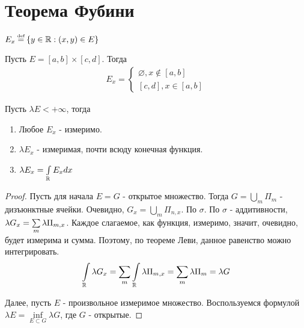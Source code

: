 \section{Теорема Фубини}

\begin{definition}
    $E_x \defeq \set{y \in \mathbb{R} : (x, y) \in E}$
\end{definition}

\begin{example}
    Пусть $E = [a, b] \times [c, d]$. Тогда 
    \begin{gather*}
        E_x = 
        \left\{ \begin{matrix}
                \varnothing, x \notin [a,b] 
                \\ 
                [c, d], x \in [a, b]
        \end{matrix}\right.
    \end{gather*}
\end{example}

\begin{theorem}
    Пусть $\lambda E < +\infty$, тогда
    \begin{enumerate}
        \item 
            Любое $E_x$ - измеримо.
        \item
            $\lambda E_x$ - измеримая, почти всюду конечная функция. 
        \item
            $\lambda E_x = \int\limits_{\mathbb{R}} E_x dx$
    \end{enumerate}
\end{theorem}

\begin{proof}
    Пусть для начала $E = G$ - открытое множество. Тогда $G = \bigcup\limits_{m} \Pi_m$ - дизъюнктные ячейки. 
    Очевидно, $G_x = \bigcup\limits_{m} \Pi_{n, x}$. По $\sigma$. По $\sigma$ - аддитивности, $\lambda G_x = \sum\limits_{m}\lambda \Pi_{m, x}$.
    Каждое слагаемое, как функция, измеримо, значит, очевидно, будет измерима и сумма. 
    Поэтому, по теореме Леви, данное равенство можно интегрировать. 
    \begin{gather*}
        \int\limits_{\mathbb{R}} \lambda G_x = \sum\limits_{m} \int\limits_{\mathbb{R}} \lambda \Pi_{m ,x} = \sum\limits_{m} \lambda \Pi_m = \lambda G
    \end{gather*}

    Далее, пусть $E$ - произвольное измеримое множество. Воспользуемся формулой $\lambda E = \inf\limits_{E \subset G} \lambda G$, где $G$ - открытые.
    \todo
\end{proof}


